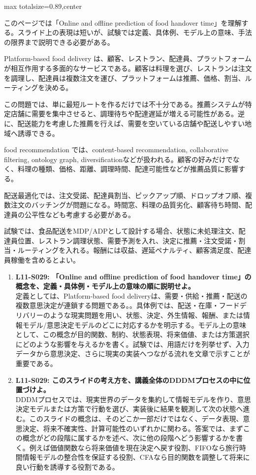 \begin{minipage}[t]{0.58\textwidth}
\begin{adjustbox}{max totalsize={\textwidth}{0.89\textheight},center}
\begin{minipage}{\textwidth}\scriptsize
{}このページでは「Online and offline prediction of food handover time」を理解する。スライド上の表現は短いが、試験では定義、具体例、モデル上の意味、手法の限界まで説明できる必要がある。\par
Platform-based food delivery は、顧客、レストラン、配達員、プラットフォームが相互作用する多面的なサービスである。顧客は料理を選び、レストランは注文を調理し、配達員は複数注文を運び、プラットフォームは推薦、価格、割当、ルーティングを決める。\par
この問題では、単に最短ルートを作るだけでは不十分である。推薦システムが特定店舗に需要を集中させると、調理待ちや配達遅延が増える可能性がある。逆に、配送能力を考慮した推薦を行えば、需要を空いている店舗や配送しやすい地域へ誘導できる。\par
food recommendation では、content-based recommendation, collaborative filtering, ontology graph, diversificationなどが扱われる。顧客の好みだけでなく、料理の種類、価格、距離、調理時間、配達可能性などが推薦品質に影響する。\par
配送最適化では、注文受諾、配達員割当、ピックアップ順、ドロップオフ順、複数注文のバッチングが問題になる。時間窓、料理の品質劣化、顧客待ち時間、配達員の公平性なども考慮する必要がある。\par
試験では、食品配送をMDP/ADPとして設計する場合、状態に未処理注文、配達員位置、レストラン調理状態、需要予測を入れ、決定に推薦・注文受諾・割当・ルーティングを入れる。報酬には収益、遅延ペナルティ、顧客満足度、配達員稼働を含めるとよい。\par{}\begin{enumerate}\item \textbf{L11-S029: 「Online and offline prediction of food handover time」の概念を、定義・具体例・モデル上の意味の順に説明せよ。}\\定義としては、Platform-based food deliveryは、需要・供給・推薦・配送の複数意思決定が連鎖する問題である。。具体例では、配送・在庫・フードデリバリーのような現実問題を用い、状態、決定、外生情報、報酬、または情報モデル/意思決定モデルのどこに対応するかを明示する。モデル上の意味として、この概念が目的関数、制約、状態表現、将来価値、または方策選択にどのような影響を与えるかを書く。試験では、用語だけを列挙せず、入力データから意思決定、さらに現実の実装へつながる流れを文章で示すことが重要である。\item \textbf{L11-S029: このスライドの考え方を、講義全体のDDDMプロセスの中に位置づけよ。}\\DDDMプロセスでは、現実世界のデータを集約して情報モデルを作り、意思決定モデルまたは方策で行動を選び、実装後に結果を観測して次の状態へ進む。このスライドの概念は、そのどこか一部だけではなく、データ表現、意思決定、将来不確実性、計算可能性のいずれかに関わる。答案では、まずこの概念がどの段階に属するかを述べ、次に他の段階へどう影響するかを書く。例えば価値関数なら将来価値を現在決定へ戻す役割、FIFOなら旅行時間情報モデルの整合性を保証する役割、CFAなら目的関数を調整して将来に良い行動を誘導する役割である。\end{enumerate}

\end{minipage}
\end{adjustbox}
\end{minipage}
